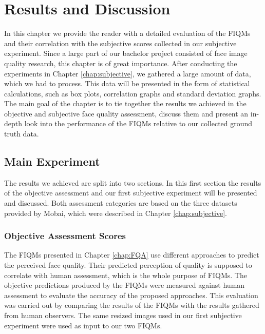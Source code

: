 \chapter{Results and Discussion}
\label{chap:Results}
In this chapter we provide the reader with a detailed evaluation of the FIQMs and their correlation with the subjective scores collected in our subjective experiment. Since a large part of our bachelor project consisted of face image quality research, this chapter is of great importance. After conducting the experiments in Chapter \ref{chap:subjective}, we gathered a large amount of data, which we had to process. This data will be presented in the form of statistical calculations, such as box plots, correlation graphs and standard deviation graphs. The main goal of the chapter is to tie together the results we achieved in the objective and subjective face quality assessment, discuss them and present an in-depth look into the performance of the FIQMs relative to our collected ground truth data.   

\section{Main Experiment}
The results we achieved are split into two sections. In this first section the results of the objective assessment and our first subjective experiment will be presented and discussed. Both assessment categories are based on the three datasets provided by Mobai, which were described in Chapter \ref{chap:subjective}. 




\subsection{Objective Assessment Scores}
The FIQMs presented in Chapter \ref{chap:FQA} use different approaches to predict the perceived face quality. Their predicted perception of quality is supposed to correlate with human assessment, which is the whole purpose of FIQMs. The objective predictions produced by the FIQMs were measured against human assessment to evaluate the accuracy of the proposed approaches. This evaluation was carried out by comparing the results of the FIQMs with the results gathered from human observers. The same resized images used in our first subjective experiment were used as input to our two FIQMs. 
\newpage


